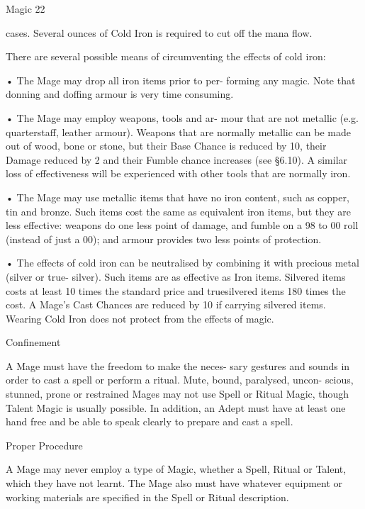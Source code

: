 \begin{Chapter}{Magic}
22 

cases.  Several  ounces  of  Cold  Iron  is  required  to 
cut off the mana flow. 

There are several possible means of circumventing 
the effects of cold iron:  

•  The  Mage  may  drop  all  iron  items  prior  to  per-
forming any magic. Note that donning and doffing 
armour is very time consuming.  

•  The  Mage  may  employ  weapons,  tools  and  ar-
mour that are not metallic (e.g. quarterstaff, leather 
armour).  Weapons  that  are  normally  metallic  can 
be made out of wood, bone or stone, but their Base 
Chance is reduced by 10, their Damage reduced by 
2 and their Fumble chance increases (see §6.10). A 
similar  loss  of  effectiveness  will  be  experienced 
with other tools that are normally iron.  

•  The  Mage  may  use  metallic  items  that  have  no 
iron  content,  such  as  copper,  tin  and  bronze.  Such 
items  cost  the  same  as  equivalent  iron  items,  but 
they  are  less  effective:  weapons  do  one  less  point 
of  damage,  and  fumble  on  a 98  to 00  roll  (instead 
of  just  a 00);  and  armour provides  two  less points 
of protection.  

•  The  effects  of  cold  iron  can  be  neutralised  by 
combining  it  with  precious  metal  (silver  or  true-
silver).  Such  items  are  as  effective  as  Iron  items. 
Silvered  items  costs  at  least  10  times  the  standard 
price  and  truesilvered  items  180  times  the  cost.  A 
Mage’s Cast Chances are reduced by 10 if carrying 
silvered items. Wearing Cold Iron does not protect 
from the effects of magic. 

Confinement 

A Mage must have the freedom to make the neces-
sary gestures and sounds in order to cast a spell or 
perform  a  ritual.  Mute,  bound,  paralysed,  uncon-
scious, stunned, prone or restrained Mages may not 
use Spell or Ritual Magic, though Talent Magic is 
usually  possible.  In  addition,  an  Adept  must  have 
at least one hand free and be able to  speak clearly 
to prepare and cast a spell. 

Proper Procedure 

A  Mage  may  never  employ  a  type  of  Magic, 
whether a Spell, Ritual or Talent, which they have 
not  learnt.  The  Mage  also  must  have  whatever 
equipment or working materials are specified in the 
Spell or Ritual description. 


\end{Chapter}
